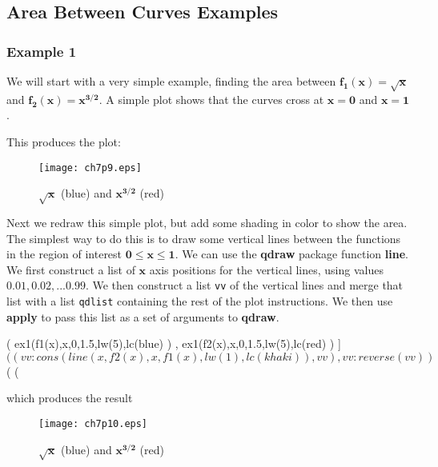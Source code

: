 \documentclass[12pt]{article}
\begin{document}
\subsection{Area Between Curves Examples}
\subsubsection*{Example 1}  
We will start with a very simple example, finding the area between $\mathbf{f_{1}(x) = \sqrt{x}}$
  and $\mathbf{f_{2}(x) = x^{3/2}}$.
A simple plot shows that the curves cross at $\mathbf{x = 0}$ and $\mathbf{x = 1}$.
This produces the plot:
\begin{figure} [h!]
   \centerline{\texttt{[image: ch7p9.eps]} }
	\caption{$\mathbf{\sqrt{x}}$ (blue) and $\mathbf{x^{3/2}}$ (red)}
\end{figure}
%

\newpage
\noindent Next we redraw this simple plot, but add some shading in color
  to show the area.
The simplest way to do this is to draw some vertical lines
  between the functions in the region of interest $$.
We can use the \textbf{qdraw} package function \textbf{line}.
We first construct a list of $$ axis positions for the vertical
  lines, using values $$.
We then construct a list \verb|vv| of the vertical lines and
  merge that list with a list \verb|qdlist| containing the rest of
  the plot instructions.
We then use \textbf{apply} to pass this list as a set of arguments 
  to \textbf{qdraw}.
\begin{myVerbatim}
(%
         ex1(f1(x),x,0,1.5,lw(5),lc(blue) ) ,
         ex1(f2(x),x,0,1.5,lw(5),lc(red) ) ]$
(%
(%
        vv:cons(line(x,f2(x),x,f1(x),lw(1),lc(khaki) ),vv),
        vv:reverse(vv) )$
(%
(%
\end{myVerbatim}
which produces the result
\begin{figure} [h]
   \centerline{\texttt{[image: ch7p10.eps]} }
	\caption{$\mathbf{\sqrt{x}}$ (blue) and $\mathbf{x^{3/2}}$ (red)}
\end{figure}
%
\end{document}
